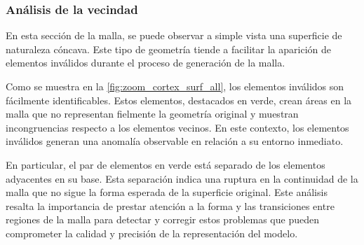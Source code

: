 
\subsubsection{Análisis de la vecindad}

En esta sección de la malla, se puede observar a simple vista una superficie de naturaleza cóncava. Este tipo de geometría tiende a facilitar la aparición de elementos inválidos durante el proceso de generación de la malla.

Como se muestra en la \autoref{fig:zoom_cortex_surf_all}, los elementos inválidos son fácilmente identificables. Estos elementos, destacados en verde, crean áreas en la malla que no representan fielmente la geometría original y muestran incongruencias respecto a los elementos vecinos. En este contexto, los elementos inválidos generan una anomalía observable en relación a su entorno inmediato.

En particular, el par de elementos en verde está separado de los elementos adyacentes en su base. Esta separación indica una ruptura en la continuidad de la malla que no sigue la forma esperada de la superficie original. Este análisis resalta la importancia de prestar atención a la forma y las transiciones entre regiones de la malla para detectar y corregir estos problemas que pueden comprometer la calidad y precisión de la representación del modelo.

